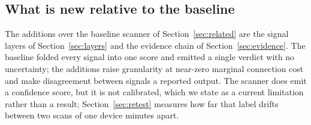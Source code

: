 \documentclass[conference]{IEEEtran}
\begin{document}
\subsection{What is new relative to the baseline}\label{sec:novelty}
The additions over the baseline scanner of Section~\ref{sec:related} are the
signal layers of Section~\ref{sec:layers} and the evidence chain of
Section~\ref{sec:evidence}. The baseline folded every signal into one score
and emitted a single verdict with no uncertainty; the additions raise
granularity at near-zero marginal connection cost and make disagreement
between signals a reported output. The scanner does emit a confidence score,
but it is not calibrated, which we state as a current limitation rather than
a result; Section~\ref{sec:retest} measures how far that label drifts between
two scans of one device minutes apart.
\end{document}
